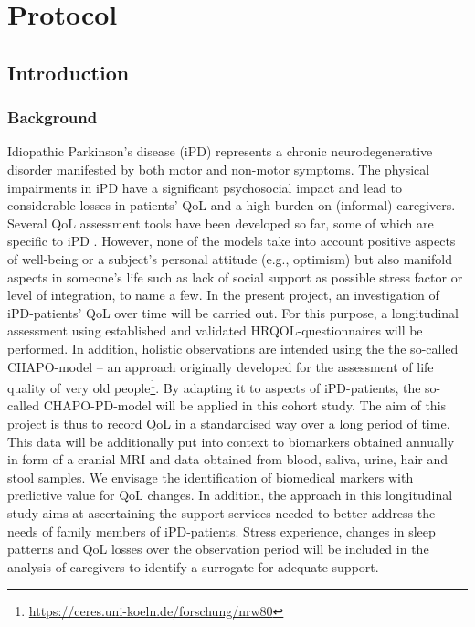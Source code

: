 \chapter{Protocol}
\section{Introduction}
\subsection{Background}
Idiopathic Parkinson's disease (\acs{iPD}) represents a chronic neurodegenerative disorder manifested by both motor and non-motor symptoms. The physical impairments in \ac{iPD} have a significant psychosocial impact and lead to considerable losses in patients'  \ac{QoL} and a high burden on (informal) caregivers. Several \ac{QoL} assessment tools have been developed so far, some of which are specific to \ac{iPD} \cite{stuhrenberg2022jpm}. However, none of the models take into account positive aspects of well-being or a subject's personal attitude (e.g., optimism) but also manifold aspects in someone's life such as lack of social support as possible stress factor or level of integration, to name a few. In the present project, an investigation of \ac{iPD}-patients' \ac{QoL} over time will be carried out. For this purpose, a longitudinal assessment using established and validated \ac{HRQOL}-questionnaires will be performed. In addition, holistic observations are intended using the the so-called \textsc{CHAPO}-model -- an approach originally developed for the assessment of life quality of very old people\footnote{\url{https://ceres.uni-koeln.de/forschung/nrw80}}. By adapting it to aspects of \ac{iPD}-patients, the so-called \acs{CHAPO}-\textsc{PD}-model \cite{thieken2022jpd} will be applied in this cohort study. The aim of this project is thus to record \ac{QoL} in a standardised way over a long period of time. This data will be additionally put into context to biomarkers obtained annually in form of a cranial \ac{MRI} and data obtained from blood, saliva, urine, hair and stool samples. We envisage the identification of biomedical markers with predictive value for \ac{QoL} changes. In addition, the approach in this longitudinal study aims at ascertaining the support services needed to better address the needs of family members of \ac{iPD}-patients. Stress experience, changes in sleep patterns and \ac{QoL} losses over the observation period will be included in the analysis of caregivers to identify a surrogate for adequate support.

